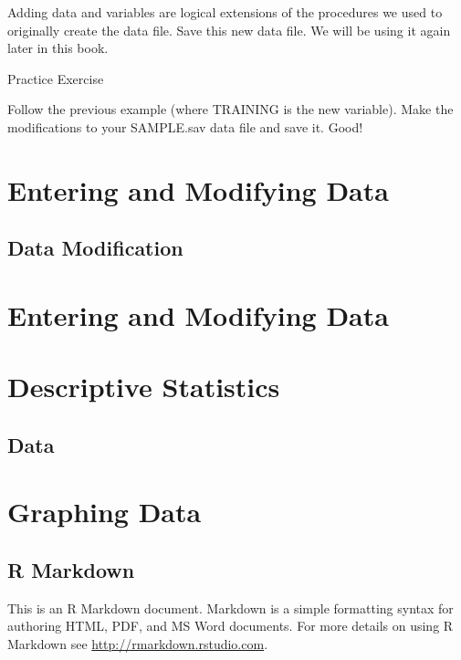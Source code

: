 \documentclass[
]{book}
\begin{document}
Adding data and variables are logical extensions of the procedures we used to originally create the data file. Save this new data file. We will be using it again later in this book.

Practice Exercise

Follow the previous example (where TRAINING is the new variable). Make the modifications to your SAMPLE.sav data file and save it. Good!

\hypertarget{entering-and-modifying-data}{%
\chapter{Entering and Modifying Data}\label{entering-and-modifying-data}}

\hypertarget{data-modification}{%
\section{Data Modification}\label{data-modification}}

\hypertarget{entering-and-modifying-data-1}{%
\chapter{Entering and Modifying Data}\label{entering-and-modifying-data-1}}

\hypertarget{descriptive-statistics}{%
\chapter{Descriptive Statistics}\label{descriptive-statistics}}

\hypertarget{data}{%
\section{Data}\label{data}}

\hypertarget{graphing-data}{%
\chapter{Graphing Data}\label{graphing-data}}

\hypertarget{r-markdown}{%
\section{R Markdown}\label{r-markdown}}

This is an R Markdown document. Markdown is a simple formatting syntax for authoring HTML, PDF, and MS Word documents. For more details on using R Markdown see \url{http://rmarkdown.rstudio.com}.
\end{document}
